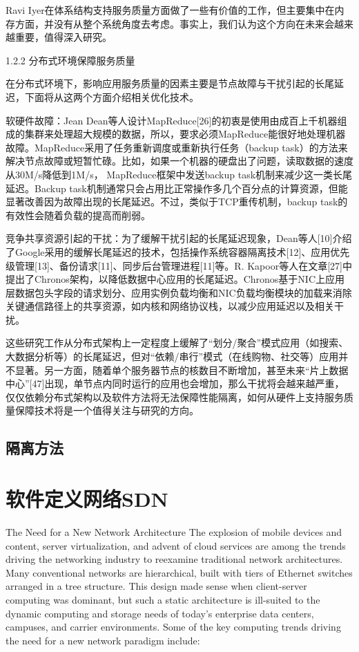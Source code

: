 Ravi Iyer在体系结构支持服务质量方面做了一些有价值的工作，但主要集中在内存方面，并没有从整个系统角度去考虑。事实上，我们认为这个方向在未来会越来越重要，值得深入研究。
 
1.2.2 分布式环境保障服务质量

在分布式环境下，影响应用服务质量的因素主要是节点故障与干扰引起的长尾延迟，下面将从这两个方面介绍相关优化技术。

软硬件故障：Jean Dean等人设计MapReduce[26]的初衷是使用由成百上千机器组成的集群来处理超大规模的数据，所以，要求必须MapReduce能很好地处理机器故障。MapReduce采用了任务重新调度或重新执行任务（backup task）的方法来解决节点故障或短暂忙碌。比如，如果一个机器的硬盘出了问题，读取数据的速度从30M/s降低到1M/s， MapReduce框架中发送backup task机制来减少这一类长尾延迟。Backup task机制通常只会占用比正常操作多几个百分点的计算资源，但能显著改善因为故障出现的长尾延迟。不过，类似于TCP重传机制，backup task的有效性会随着负载的提高而削弱。


竞争共享资源引起的干扰：为了缓解干扰引起的长尾延迟现象，Dean等人[10]介绍了Google采用的缓解长尾延迟的技术，包括操作系统容器隔离技术[12]、应用优先级管理[13]、备份请求[11]、同步后台管理进程[11]等。R. Kapoor等人在文章[27]中提出了Chronos架构，以降低数据中心应用的长尾延迟。Chronos基于NIC上应用层数据包头字段的请求划分、应用实例负载均衡和NIC负载均衡模块的加载来消除关键通信路径上的共享资源，如内核和网络协议栈，以减少应用延迟以及相关干扰。

这些研究工作从分布式架构上一定程度上缓解了“划分/聚合”模式应用（如搜索、大数据分析等）的长尾延迟，但对“依赖/串行”模式（在线购物、社交等）应用并不显著。另一方面，随着单个服务器节点的核数目不断增加，甚至未来“片上数据中心”[47]出现，单节点内同时运行的应用也会增加，那么干扰将会越来越严重，仅仅依赖分布式架构以及软件方法将无法保障性能隔离，如何从硬件上支持服务质量保障技术将是一个值得关注与研究的方向。


\subsection{隔离方法}
\label{sec:multifig}

\section{软件定义网络SDN}
\label{sec:background:sdn}

The Need for a New Network Architecture %
The explosion of mobile devices and content, server virtualization, and
advent of cloud services are among the trends driving the networking
industry to reexamine traditional network architectures. Many conventional
networks are hierarchical, built with tiers of Ethernet switches arranged in
a tree structure. This design made sense when client-server computing
was dominant, but such a static architecture is ill-suited to the dynamic
computing and storage needs of today’s enterprise data centers,
campuses, and carrier environments. Some of the key computing trends
driving the need for a new network paradigm include:

